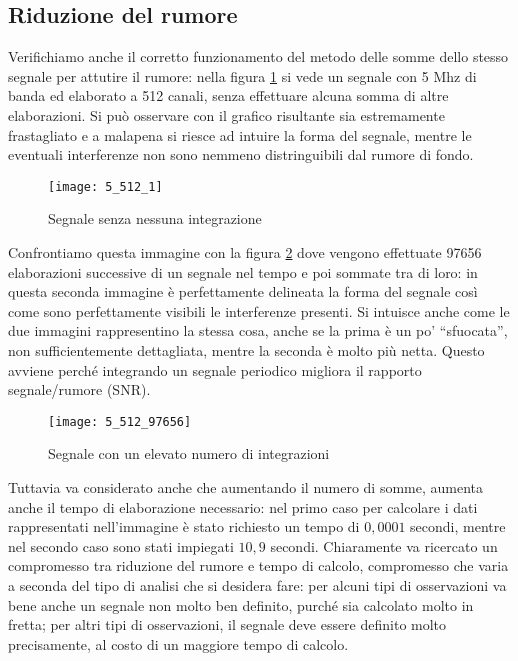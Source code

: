 \subsection{Riduzione del rumore}
Verifichiamo anche il corretto funzionamento del metodo delle somme dello stesso
segnale per attutire il rumore: nella figura \ref{fig:low_int} si vede un
segnale con 5 Mhz di banda ed elaborato a 512 canali, senza effettuare alcuna
somma di altre elaborazioni. Si pu\`o osservare con il grafico risultante sia
estremamente frastagliato e a malapena si riesce ad intuire la forma del
segnale, mentre le eventuali interferenze non sono nemmeno distringuibili dal
rumore di fondo.
\begin{figure}[htb]
	\begin{center}
		\texttt{[image: 5\_512\_1]}
	\end{center}
	\caption{Segnale senza nessuna integrazione}
	\label{fig:low_int}
\end{figure}

Confrontiamo questa immagine con la figura \ref{fig:high_int} dove vengono
effettuate 97656 elaborazioni successive di un segnale nel tempo e poi sommate
tra di loro: in questa seconda immagine \`e perfettamente delineata la forma del
segnale cos\`i come sono perfettamente visibili le interferenze presenti.  Si
intuisce anche come le due immagini rappresentino la stessa cosa, anche se la
prima \`e un po' ``sfuocata'', non sufficientemente dettagliata, mentre la
seconda \`e molto pi\`u netta. Questo avviene perch\'e integrando un segnale
periodico migliora il rapporto segnale/rumore (SNR).
\begin{figure}[htb]
	\begin{center}
		\texttt{[image: 5\_512\_97656]}
	\end{center}
	\caption{Segnale con un elevato numero di integrazioni}
	\label{fig:high_int}
\end{figure}

Tuttavia va considerato anche che aumentando il numero di somme, aumenta anche
il tempo di elaborazione necessario: nel primo caso per calcolare i dati
rappresentati nell'immagine \`e stato richiesto un tempo di $0,0001$ secondi,
mentre nel secondo caso sono stati impiegati $10,9$ secondi.  Chiaramente va
ricercato un compromesso tra riduzione del rumore e tempo di calcolo,
compromesso che varia a seconda del tipo di analisi che si desidera fare: per
alcuni tipi di osservazioni va bene anche un segnale non molto ben definito,
purch\'e sia calcolato molto in fretta; per altri tipi di osservazioni, il
segnale deve essere definito molto precisamente, al costo di un maggiore tempo
di calcolo.

